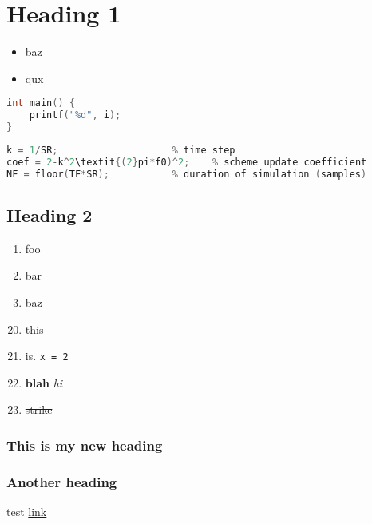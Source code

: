 \documentclass{article}
\begin{document}
\section{Heading 1}
\begin{itemize}
    \item baz
    \item qux
\end{itemize}

\begin{lstlisting}[language=c, style=myStyle]
int main() {
    printf("%d", i);
}
\end{lstlisting}

\begin{lstlisting}[language=c, style=myStyle]
% derived parameters
k = 1/SR;                    % time step
coef = 2-k^2\textit{(2}pi*f0)^2;    % scheme update coefficient
NF = floor(TF*SR);           % duration of simulation (samples)
\end{lstlisting}

\subsection{Heading 2}
\begin{enumerate}
    \setcounter{enumi}{0}
    \item foo
    \item bar
    \item baz
\end{enumerate}

\begin{enumerate}
    \setcounter{enumi}{19}
    \item this
    \item is. \verb|x = 2|
    \item \textbf{blah} \textit{hi}
    \item \sout{strike}
\end{enumerate}

\subsubsection{This is my new heading}
\subsubsection{Another heading}
test \href{https://duckduckgo.com}{link}
\end{document}
